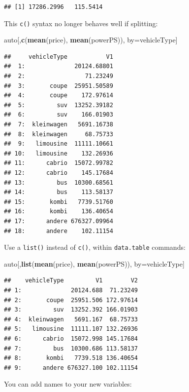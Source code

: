 \documentclass[]{book}
\newenvironment{Shaded}{\begin{snugshade}}{\end{snugshade}}
\newcommand{\KeywordTok}[1]{\textcolor[rgb]{0.13,0.29,0.53}{\textbf{#1}}}
\newcommand{\NormalTok}[1]{#1}
\theoremstyle{definition}
\theoremstyle{definition}
\theoremstyle{definition}
\theoremstyle{remark}
\begin{document}
\begin{verbatim}
## [1] 17286.2996   115.5414
\end{verbatim}

This \texttt{c()} syntax no longer behaves well if splitting:

\begin{Shaded}
\begin{Highlighting}[]
\NormalTok{auto[,}\KeywordTok{c}\NormalTok{(}\KeywordTok{mean}\NormalTok{(price), }\KeywordTok{mean}\NormalTok{(powerPS)), by=vehicleType]}
\end{Highlighting}
\end{Shaded}

\begin{verbatim}
##     vehicleType           V1
##  1:              20124.68801
##  2:                 71.23249
##  3:       coupe  25951.50589
##  4:       coupe    172.97614
##  5:         suv  13252.39182
##  6:         suv    166.01903
##  7:  kleinwagen   5691.16738
##  8:  kleinwagen     68.75733
##  9:   limousine  11111.10661
## 10:   limousine    132.26936
## 11:      cabrio  15072.99782
## 12:      cabrio    145.17684
## 13:         bus  10300.68561
## 14:         bus    113.58137
## 15:       kombi   7739.51760
## 16:       kombi    136.40654
## 17:      andere 676327.09964
## 18:      andere    102.11154
\end{verbatim}

Use a \texttt{list()} instead of \texttt{c()}, within \texttt{data.table} commands:

\begin{Shaded}
\begin{Highlighting}[]
\NormalTok{auto[,}\KeywordTok{list}\NormalTok{(}\KeywordTok{mean}\NormalTok{(price), }\KeywordTok{mean}\NormalTok{(powerPS)), by=vehicleType]}
\end{Highlighting}
\end{Shaded}

\begin{verbatim}
##    vehicleType         V1        V2
## 1:              20124.688  71.23249
## 2:       coupe  25951.506 172.97614
## 3:         suv  13252.392 166.01903
## 4:  kleinwagen   5691.167  68.75733
## 5:   limousine  11111.107 132.26936
## 6:      cabrio  15072.998 145.17684
## 7:         bus  10300.686 113.58137
## 8:       kombi   7739.518 136.40654
## 9:      andere 676327.100 102.11154
\end{verbatim}

You can add names to your new variables:
\end{document}
